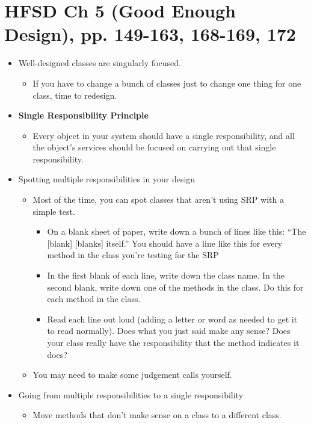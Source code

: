 \documentclass[letterpaper]{article}
\begin{document}
\section{HFSD Ch 5 (Good Enough Design), pp. 149-163, 168-169, 172}
\begin{itemize}
    \item Well-designed classes are singularly focused.
    \begin{itemize}
        \item If you have to change a bunch of classes just to change one thing for one class, time to redesign.
    \end{itemize}
    
    \item \textbf{Single Responsibility Principle}
    \begin{itemize}
        \item Every object in your system should have a single responsibility, and all the object's services should be focused on carrying out that single responsibility.
    \end{itemize}

    \item Spotting multiple responsibilities in your design 
    \begin{itemize}
        \item Most of the time, you can spot classes that aren't using SRP with a simple test.
        \begin{itemize}
            \item On a blank sheet of paper, write down a bunch of lines like this: ``The [blank] [blanks] itself.'' You should have a line like this for every method in the class you're testing for the SRP 
            \item In the first blank of each line, write down the class name. In the second blank, write down one of the methods in the class. Do this for each method in the class. 
            \item Read each line out loud (adding a letter or word as needed to get it to read normally). Does what you just said make any sense? Does your class really have the responsibility that the method indicates it does? 
        \end{itemize}
        \item You may need to make some judgement calls yourself.
    \end{itemize}

    \item Going from multiple responsibilities to a single responsibility 
    \begin{itemize}
        \item Move methods that don't make sense on a class to a different class. 
    \end{itemize}


\end{itemize}
\end{document}
